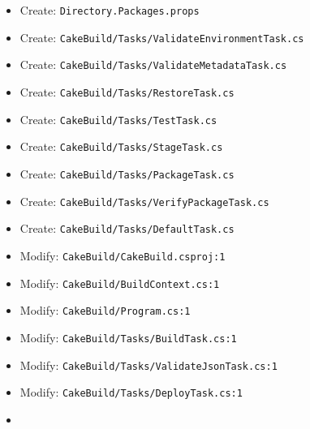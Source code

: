 \documentclass[
  10pt,
  letterpaper,
]{article}
\providecommand{\tightlist}{%
  \setlength{\itemsep}{0pt}\setlength{\parskip}{0pt}}
\begin{document}
\begin{itemize}
\tightlist
\item
  Create:
  \texttt{Directory.}\allowbreak{}\texttt{Packages.}\allowbreak{}\texttt{props}
\item
  Create:
  \texttt{CakeBuild/}\allowbreak{}\texttt{Tasks/}\allowbreak{}\texttt{ValidateEnvironmentTask.}\allowbreak{}\texttt{cs}
\item
  Create:
  \texttt{CakeBuild/}\allowbreak{}\texttt{Tasks/}\allowbreak{}\texttt{ValidateMetadataTask.}\allowbreak{}\texttt{cs}
\item
  Create:
  \texttt{CakeBuild/}\allowbreak{}\texttt{Tasks/}\allowbreak{}\texttt{RestoreTask.}\allowbreak{}\texttt{cs}
\item
  Create:
  \texttt{CakeBuild/}\allowbreak{}\texttt{Tasks/}\allowbreak{}\texttt{TestTask.}\allowbreak{}\texttt{cs}
\item
  Create:
  \texttt{CakeBuild/}\allowbreak{}\texttt{Tasks/}\allowbreak{}\texttt{StageTask.}\allowbreak{}\texttt{cs}
\item
  Create:
  \texttt{CakeBuild/}\allowbreak{}\texttt{Tasks/}\allowbreak{}\texttt{PackageTask.}\allowbreak{}\texttt{cs}
\item
  Create:
  \texttt{CakeBuild/}\allowbreak{}\texttt{Tasks/}\allowbreak{}\texttt{VerifyPackageTask.}\allowbreak{}\texttt{cs}
\item
  Create:
  \texttt{CakeBuild/}\allowbreak{}\texttt{Tasks/}\allowbreak{}\texttt{DefaultTask.}\allowbreak{}\texttt{cs}
\item
  Modify:
  \texttt{CakeBuild/}\allowbreak{}\texttt{CakeBuild.}\allowbreak{}\texttt{csproj:}\allowbreak{}\texttt{1}
\item
  Modify:
  \texttt{CakeBuild/}\allowbreak{}\texttt{BuildContext.}\allowbreak{}\texttt{cs:}\allowbreak{}\texttt{1}
\item
  Modify:
  \texttt{CakeBuild/}\allowbreak{}\texttt{Program.}\allowbreak{}\texttt{cs:}\allowbreak{}\texttt{1}
\item
  Modify:
  \texttt{CakeBuild/}\allowbreak{}\texttt{Tasks/}\allowbreak{}\texttt{BuildTask.}\allowbreak{}\texttt{cs:}\allowbreak{}\texttt{1}
\item
  Modify:
  \texttt{CakeBuild/}\allowbreak{}\texttt{Tasks/}\allowbreak{}\texttt{ValidateJsonTask.}\allowbreak{}\texttt{cs:}\allowbreak{}\texttt{1}
\item
  Modify:
  \texttt{CakeBuild/}\allowbreak{}\texttt{Tasks/}\allowbreak{}\texttt{DeployTask.}\allowbreak{}\texttt{cs:}\allowbreak{}\texttt{1}
\item

\end{itemize}
\end{document}
